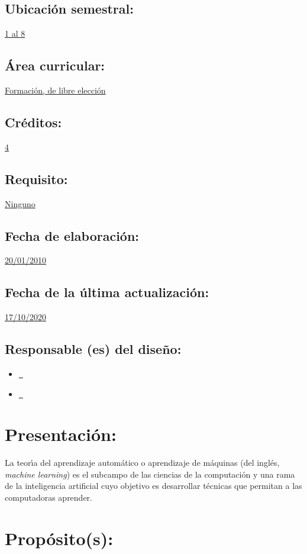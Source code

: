 \documentclass[10 pt]{article}
\begin{document}
\subsection{Ubicaci\'{o}n semestral:} \underline{1 al 8}
\subsection{\'{A}rea curricular:} \underline{Formaci\'{o}n, de libre elecci\'{o}n}
\subsection{Cr\'{e}ditos:} \underline{4}
\subsection{Requisito:} \underline{Ninguno}
\subsection{Fecha de elaboraci\'{o}n:} \underline{20/01/2010}
\subsection{Fecha de la \'{u}ltima actualizaci\'{o}n:} \underline{17/10/2020}
\subsection{Responsable (es) del dise\~{n}o:}
\begin{itemize}[label={}]
\item \underline{\narturo~\arturo}
\item \underline{\nelisa~\elisa}
\end{itemize}

\newpage

\section{Presentaci\'{o}n:}

La teor\'{\i}a del aprendizaje autom\'{a}tico o aprendizaje de m\'{a}quinas (del
ingl\'{e}s, {\em machine learning}) es el subcampo de las ciencias de la
computaci\'{o}n y una rama de la inteligencia artificial cuyo objetivo es
desarrollar t\'{e}cnicas que permitan a las computadoras aprender.



\section{Prop\'{o}sito(s):}
\end{document}
